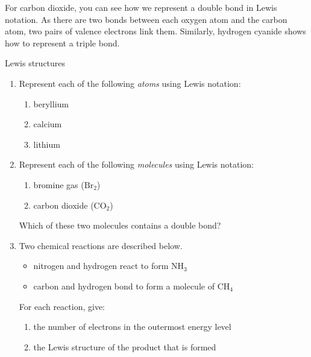 For carbon dioxide, you can see how we represent a double bond in Lewis notation. As there are two bonds between each oxygen atom and the carbon atom, two pairs of valence electrons link them. Similarly, hydrogen cyanide shows how to represent a triple bond.
    \noindent
\label{m38701*secfhsst!!!underscore!!!id327}
            \begin{exercises}{Lewis structures}
            \nopagebreak \noindent
      \label{m38701*id140889}\begin{enumerate}[noitemsep, label=\textbf{\arabic*}. ] 
            \label{m38701*uid23}\item Represent each of the following \textsl{atoms} using Lewis notation:
\label{m38701*id140910}\begin{enumerate}[noitemsep, label=\textbf{\alph*}. ] 
            \label{m38701*uid24}\item beryllium
\label{m38701*uid25}\item calcium
\label{m38701*uid26}\item lithium
\end{enumerate}
                \label{m38701*uid27}\item Represent each of the following \textsl{molecules} using Lewis notation:
\label{m38701*id140969}\begin{enumerate}[noitemsep, label=\textbf{\alph*}. ] 
            \label{m38701*uid28}\item bromine gas ($\text{Br}{}_{2}$)
\label{m38701*uid29}\item carbon dioxide ($\text{CO}{}_{2}$)
\end{enumerate}
Which of these two molecules contains a double bond?
\label{m38701*uid31}\item Two chemical reactions are described below.
\label{m38701*id141048}\begin{itemize}[noitemsep]
            \label{m38701*uid32}\item nitrogen and hydrogen react to form $\text{NH}_{3}$\label{m38701*uid33}
\item carbon and hydrogen bond to form a molecule of $\text{CH}_{4}$\end{itemize}
For each reaction, give:
\label{m38701*id141106}\begin{enumerate}[noitemsep, label=\textbf{\alph*}. ] 
\item the number of electrons in the outermost energy level
\label{m38701*uid35}\item the Lewis structure of the product that is formed

\end{enumerate}
\end{enumerate}
\end{exercises}
